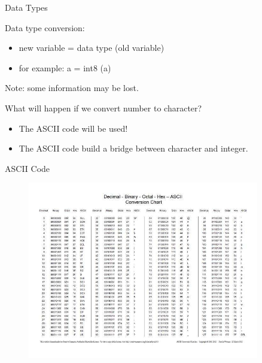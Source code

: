 \begin{frame}{Data Types}
\begin{block}{Data type conversion:}
\begin{itemize}
\item new variable = data type (old variable)
\item for example: a = int8 (a)
\end{itemize}
Note: some information may be lost.
\end{block}
What will happen if we convert number to character?
\begin{itemize}
\item The ASCII code will be used!
\item The ASCII code build a bridge between character and integer.
\end{itemize}
\end{frame}

\begin{frame}{ASCII Code}
\begin{figure}[htbp]
\centering
\includegraphics[width=0.9\textwidth]{pic/ascii.jpeg}
\end{figure}
\end{frame}

